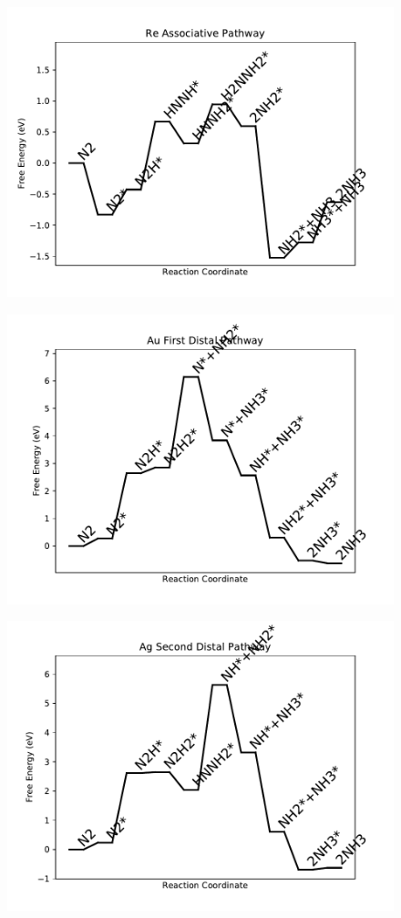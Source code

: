 \begin{figure}
\includegraphics[width=0.8\linewidth]{data/plots/Re_associative.pdf}
\end{figure}

\begin{figure}
\includegraphics[width=0.8\linewidth]{data/plots/Au_distal_1.pdf}
\end{figure}

\begin{figure}
\includegraphics[width=0.8\linewidth]{data/plots/Ag_distal_2.pdf}
\end{figure}

